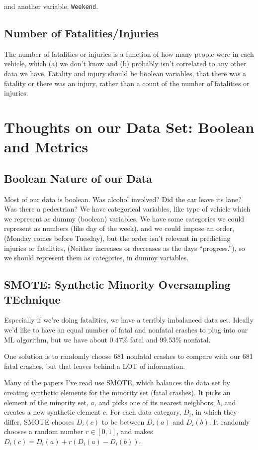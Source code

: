 \documentclass[11pt]{article}
\begin{document}
\begin{spacing}{1.2}
and another variable, {\tt Weekend}.

\subsection{Number of Fatalities/Injuries}

The number of fatalities or injuries is a function of how many people were in each vehicle, which (a) we don't know and (b) probably isn't correlated to any other data we have.  Fatality and injury should be  boolean variables, that there was a fatality or there was an injury, rather than a count of the number of fatalities or injuries.  

\section{Thoughts on our Data Set:  Boolean and Metrics}
\subsection{Boolean Nature of our Data}

Most of our data is boolean.  Was alcohol involved?  Did the car leave its lane?  Was there a pedestrian?  We have categorical variables, like type of vehicle which we represent as dummy (boolean) variables.  We have some categories we could represent as numbers (like day of the week), and we could impose an order, (Monday comes before Tuesday), but the order isn't relevant in predicting injuries or fatalities, (Neither increases or decreases as the days ``progress.''), so we should represent them as categories, in dummy variables.  

\subsection{SMOTE:  Synthetic Minority Oversampling TEchnique}

Especially if we're doing fatalities, we have a terribly imbalanced data set.  Ideally we'd like to have an equal number of fatal and nonfatal crashes to plug into our ML algorithm, but we have about 0.47\% fatal and 99.53\% nonfatal.  

One solution is to randomly choose 681 nonfatal crashes to compare with our 681 fatal crashes, but that leaves behind a LOT of information.  

Many of the papers I've read use SMOTE, which balances the data set by creating synthetic elements for the minority set (fatal crashes).  It picks an element of the minority set, $a$, and picks one of its nearest neighbors, $b$, and creates a new synthetic element $c$.  For each data category, $D_i$, in which they differ, SMOTE chooses $D_i(c)$ to be between $D_i(a)$ and $D_i(b)$.  It randomly chooses a random number $r \in [0,1]$, and makes $D_i(c) = D_i(a) + r(D_i(a) - D_i(b))$.  


\end{spacing}
\end{document}

